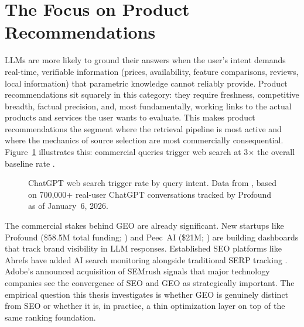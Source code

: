 \section{The Focus on Product Recommendations}
\label{sec:commercial-catalyst}

LLMs are more likely to ground their answers when the user's intent demands real-time, verifiable information (prices, availability, feature comparisons, reviews, local information) that parametric knowledge cannot reliably provide. Product recommendations sit squarely in this category: they require freshness, competitive breadth, factual precision, and, most fundamentally, working links to the actual products and services the user wants to evaluate. This makes product recommendations the segment where the retrieval pipeline is most active and where the mechanics of source selection are most commercially consequential. Figure~\ref{fig:trigger-rate} illustrates this: commercial queries trigger web search at 3$\times$ the overall baseline rate \parencite{punturo2026citationsources}.
\begin{figure}[htbp]
    \centering
    \caption{ChatGPT web search trigger rate by query intent. Data from \textcite{punturo2026citationsources}, based on 700,000+ real-user ChatGPT conversations tracked by Profound as of January~6, 2026.}
    \label{fig:trigger-rate}
\end{figure}

The commercial stakes behind GEO are already significant. New startups like Profound (\$58.5M total funding; \cite{fortune2025profound}) and Peec~AI (\$21M; \cite{techcrunch2025peec}) are building dashboards that track brand visibility in LLM responses. Established SEO platforms like Ahrefs have added AI search monitoring alongside traditional SERP tracking \parencite{ahrefs2025aicitations}. Adobe's announced acquisition of SEMrush \parencite{adobe2025semrush} signals that major technology companies see the convergence of SEO and GEO as strategically important. The empirical question this thesis investigates is whether GEO is genuinely distinct from SEO or whether it is, in practice, a thin optimization layer on top of the same ranking foundation.
